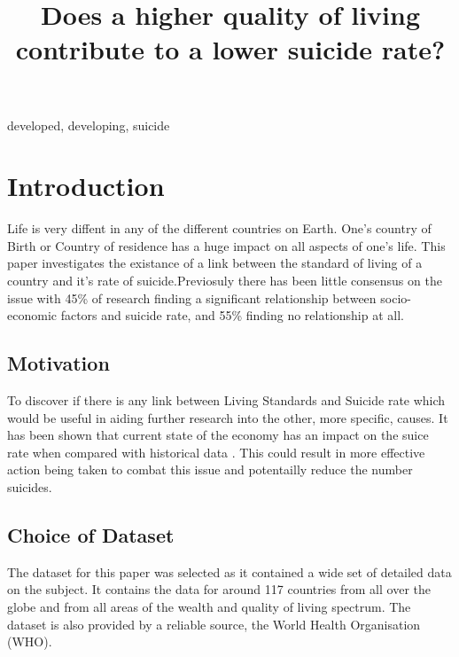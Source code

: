 \documentclass[conference]{IEEEtran}
\begin{document}
\title{Does a higher quality of living contribute to a lower suicide rate?\\
}

\author{
}

\maketitle

\begin{abstract}

\end{abstract}

\begin{IEEEkeywords}
developed, developing, suicide
\end{IEEEkeywords}

\section{Introduction}
Life is very diffent in any of the different countries on Earth. One's country of Birth or Country of residence
has a huge impact on all aspects of one's life. This paper investigates the existance of a link between
the standard of living of a country and it's rate of suicide.Previosuly there has been little consensus on the issue
with 45\% of research finding a significant relationship between socio-economic factors and suicide rate, and 55\%
finding no relationship at all\cite{sui_systematic_review}.

\subsection{Motivation}
To discover if there is any link between Living Standards and Suicide rate which would be useful in aiding further
research into the other, more specific, causes. It has been shown that current state of the economy
has an impact on the suice rate when compared with historical data \cite{Suicides_2008-10}. This could result in more effective action being taken to combat this
issue and potentailly reduce the number suicides.

\subsection{Choice of Dataset}
The dataset for this paper was selected as it contained a wide set of detailed data on the subject.
It contains the data for around 117 countries from all over the globe and from all areas of the wealth and quality of living spectrum.
The dataset is also provided by a reliable source, the World Health Organisation (WHO).
\end{document}
